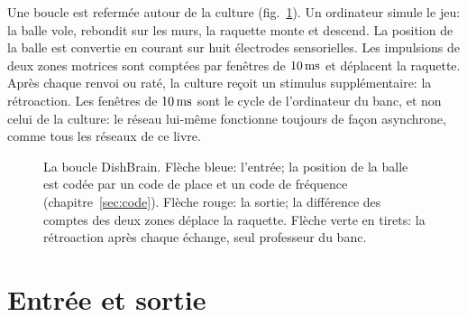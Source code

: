 Une boucle est refermée autour de la culture (fig.~\ref{fig:dishloop}). Un ordinateur simule le jeu: la balle vole, rebondit sur les murs, la raquette monte et descend. La position de la balle est convertie en courant sur huit électrodes \og sensorielles\fg{}. Les impulsions de deux zones \og motrices\fg{} sont comptées par fenêtres de $10\,\text{ms}$ et déplacent la raquette. Après chaque renvoi ou raté, la culture reçoit un stimulus supplémentaire: la rétroaction. Les fenêtres de $10\,\text{ms}$ sont le cycle de l'ordinateur du banc, et non celui de la culture: le réseau lui-même fonctionne toujours de façon asynchrone, comme tous les réseaux de ce livre.

\begin{figure}[t]
\centering
{}
\caption{La boucle DishBrain. Flèche bleue: l'entrée; la position de la balle est codée par un code de place et un code de fréquence (chapitre~\ref{sec:code}). Flèche rouge: la sortie; la différence des comptes des deux zones déplace la raquette. Flèche verte en tirets: la rétroaction après chaque échange, seul \og professeur\fg{} du banc.}
\label{fig:dishloop}
\end{figure}

\section{Entrée et sortie}

